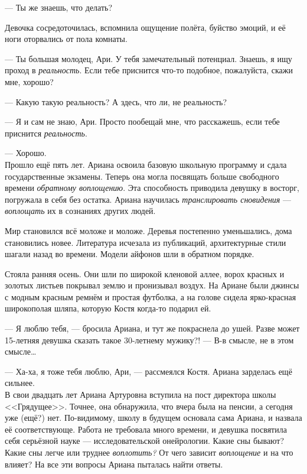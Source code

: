 \documentclass[openany, oneside]{book}
\begin{document}
--- Ты же знаешь, что делать?

Девочка сосредоточилась, вспомнила ощущение полёта, буйство эмоций, и её ноги оторвались от пола комнаты.

--- Ты большая молодец, Ари. У тебя замечательный потенциал. Знаешь, я ищу проход в \textit{реальность}. Если тебе приснится что-то подобное, пожалуйста, скажи мне, хорошо?

--- Какую такую реальность? А здесь, что ли, не реальность?

--- Я и сам не знаю, Ари. Просто пообещай мне, что расскажешь, если тебе приснится \textit{реальность}.

--- Хорошо.\\

Прошло ещё пять лет. Ариана освоила базовую школьную программу и сдала государственные экзамены. Теперь она могла посвящать больше свободного времени \textit{обратному воплощению}. Эта способность приводила девушку в восторг, погружала в себя без остатка. Ариана научилась \textit{транслировать сновидения} --- \textit{воплощать} их в сознаниях других людей.

Мир становился всё моложе и моложе. Деревья постепенно уменьшались, дома становились новее. Литература исчезала из публикаций, архитектурные стили шагали назад во времени. Модели айфонов шли в обратном порядке.

Стояла ранняя осень. Они шли по широкой кленовой аллее, ворох красных и золотых листьев покрывал землю и пронизывал воздух. На Ариане были джинсы с модным красным ремнём и простая футболка, а на голове сидела ярко-красная широкополая шляпа, которую Костя когда-то подарил ей.

--- Я люблю тебя, --- бросила Ариана, и тут же покраснела до ушей. Разве может 15-летняя девушка сказать такое 30-летнему мужику?! --- В-в смысле, не в этом смысле\dots

--- Ха-ха, я тоже тебя люблю, Ари, --- рассмеялся Костя. Ариана зарделась ещё сильнее.\\

В свои двадцать лет Ариана Артуровна вступила на пост директора школы <<Грядущее>>. Точнее, она обнаружила, что вчера была на пенсии, а сегодня уже (ещё?) нет. По-видимому, школу в будущем основала сама Ариана, и назвала её соответствующе. Работа не требовала много времени, и девушка посвятила себя серьёзной науке --- исследовательской онейрологии. Какие сны бывают? Какие сны легче или труднее \textit{воплотить?} От чего зависит \textit{воплощение} и на что влияет? На все эти вопросы Ариана пыталась найти ответы.
\end{document}
